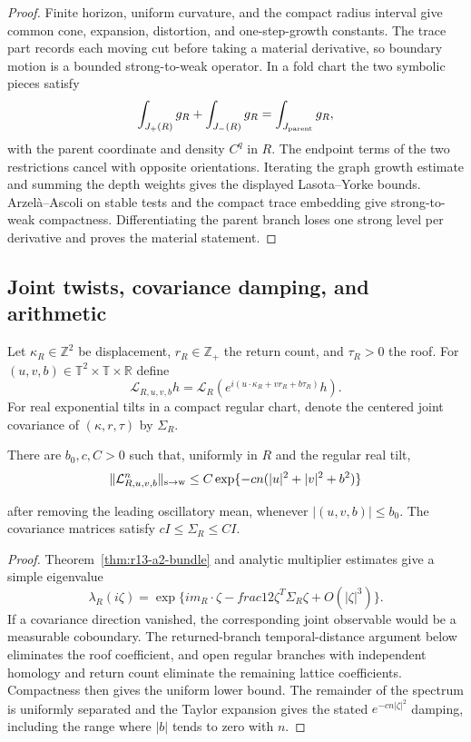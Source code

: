 \begin{proof}
Finite horizon, uniform curvature, and the compact radius interval give common
cone, expansion, distortion, and one-step-growth constants.  The trace part
records each moving cut before taking a material derivative, so boundary
motion is a bounded strong-to-weak operator.  In a fold chart the two symbolic
pieces satisfy
\[
 \int_{J_+(R)}g_R+\int_{J_-(R)}g_R
 =\int_{J_{\rm parent}}g_R,
\]
with the parent coordinate and density $C^q$ in $R$.  The endpoint terms of
the two restrictions cancel with opposite orientations.  Iterating the graph
growth estimate and summing the depth weights gives the displayed
Lasota--Yorke bounds.  Arzelà--Ascoli on stable tests and the compact trace
embedding give strong-to-weak compactness.  Differentiating the parent branch
loses one strong level per derivative and proves the material statement.
\end{proof}

\subsection{Joint twists, covariance damping, and arithmetic}

Let $\kappa_R\in\mathbb Z^2$ be displacement, $r_R\in\mathbb Z_+$ the return
count, and $\tau_R>0$ the roof.  For
$(u,v,b)\in\mathbb T^2\times\mathbb T\times\mathbb R$ define
\[
 \mathcal L_{R,u,v,b}h
 =\mathcal L_R\left(
 e^{i(u\cdot\kappa_R+v r_R+b\tau_R)}h\right).
\]
For real exponential tilts in a compact regular chart, denote the centered
joint covariance of $(\kappa,r,\tau)$ by $\Sigma_R$.

\begin{lemma}
\label{lem:r13-a2-small}
There are $b_0,c,C>0$ such that, uniformly in $R$ and the regular real tilt,
\[
 \|\mathcal L_{R,u,v,b}^n\|_{\rm s\to w}
 \le C\exp\{-cn(|u|^2+|v|^2+b^2)\}
\]

after removing the leading oscillatory mean, whenever
$|(u,v,b)|\le b_0$.  The covariance matrices satisfy
$cI\le\Sigma_R\le CI$.
\end{lemma}

\begin{proof}
Theorem~\ref{thm:r13-a2-bundle} and analytic multiplier estimates give a
simple eigenvalue
\[
 \lambda_R(i\zeta)
 =\exp\{i m_R\cdot\zeta-	frac12
          \zeta^T\Sigma_R\zeta+O(|\zeta|^3)\}.
\]
If a covariance direction vanished, the corresponding joint observable would
be a measurable coboundary.  The returned-branch temporal-distance argument
below eliminates the roof coefficient, and open regular branches with
independent homology and return count eliminate the remaining lattice
coefficients.  Compactness then gives the uniform lower bound.  The remainder
of the spectrum is uniformly separated and the Taylor expansion gives the
stated $e^{-cn|\zeta|^2}$ damping, including the range where $|b|$ tends to
zero with $n$.
\end{proof}

